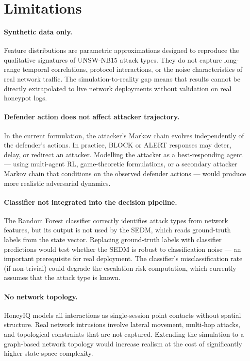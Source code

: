 \section{Limitations}
\label{sec:disc_limitations}

\paragraph{Synthetic data only.}
Feature distributions are parametric approximations designed to reproduce
the qualitative signatures of UNSW-NB15 attack types.
They do not capture long-range temporal correlations, protocol interactions,
or the noise characteristics of real network traffic.
The simulation-to-reality gap means that results cannot be directly
extrapolated to live network deployments without validation on real
honeypot logs.

\paragraph{Defender action does not affect attacker trajectory.}
In the current formulation, the attacker's Markov chain evolves
independently of the defender's actions.
In practice, BLOCK or ALERT responses may deter, delay, or redirect an
attacker.
Modelling the attacker as a best-responding agent --- using multi-agent RL,
game-theoretic formulations, or a secondary attacker Markov chain that
conditions on the observed defender actions --- would produce more realistic
adversarial dynamics.

\paragraph{Classifier not integrated into the decision pipeline.}
The Random Forest classifier correctly identifies attack types from network
features, but its output is not used by the SEDM, which reads ground-truth
labels from the state vector.
Replacing ground-truth labels with classifier predictions would test whether
the SEDM is robust to classification noise --- an important prerequisite for
real deployment.
The classifier's misclassification rate (if non-trivial) could degrade the
escalation risk computation, which currently assumes that the attack type
is known.

\paragraph{No network topology.}
HoneyIQ models all interactions as single-session point contacts without
spatial structure.
Real network intrusions involve lateral movement, multi-hop attacks, and
topological constraints that are not captured.
Extending the simulation to a graph-based network topology would increase
realism at the cost of significantly higher state-space complexity.

